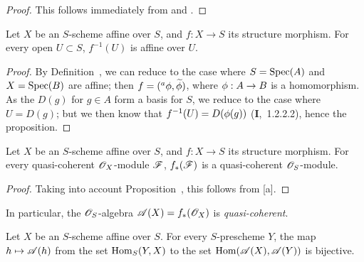 \begin{proof}
This follows immediately from  and .
\end{proof}

\begin{proposition}[1.2.5]
\label{II.1.2.5}
Let $X$ be an $S$-scheme affine over $S$, and $f:X\to S$ its structure morphism.
For every open $U\subset S$, $f^{-1}(U)$ is affine over $U$.
\end{proposition}

\begin{proof}
By Definition~, we can reduce to the case where $S=\operatorname{Spec}(A)$ and $X=\operatorname{Spec}(B)$ are affine; then $f=({}^a\phi,\widetilde{\phi})$, where $\vphi:A\to B$ is a homomorphism.
As the $D(g)$ for $g\in A$ form a basis for $S$, we reduce to the case where $U=D(g)$; but we then know that $f^{-1}(U)=D(\phi(g))$ (\textbf{I},~1.2.2.2), hence the proposition.
\end{proof}

\begin{proposition}[1.2.6]
\label{II.1.2.6}
Let $X$ be an $S$-scheme affine over $S$, and $f:X\to S$ its structure morphism.
For every quasi-coherent $\mathscr{O}_X$-module $\mathscr{F}$, $f_*(\mathscr{F})$ is a quasi-coherent $\mathscr{O}_S$-module.
\end{proposition}

\begin{proof}
Taking into account Proposition~, this follows from [a].
\end{proof}

In particular, the $\mathscr{O}_S$-algebra $\mathscr{A}(X)=f_*(\mathscr{O}_X)$ is \emph{quasi-coherent}.

\begin{proposition}[1.2.7]
\label{II.1.2.7}
Let $X$ be an $S$-scheme affine over $S$.
For every $S$-prescheme $Y$, the map $h\mapsto\sh{A}(h)$ from the set $\operatorname{Hom}_S(Y,X)$ to the set $\operatorname{Hom}(\mathscr{A}(X),\mathscr{A}(Y))$  is bijective.
\end{proposition}

